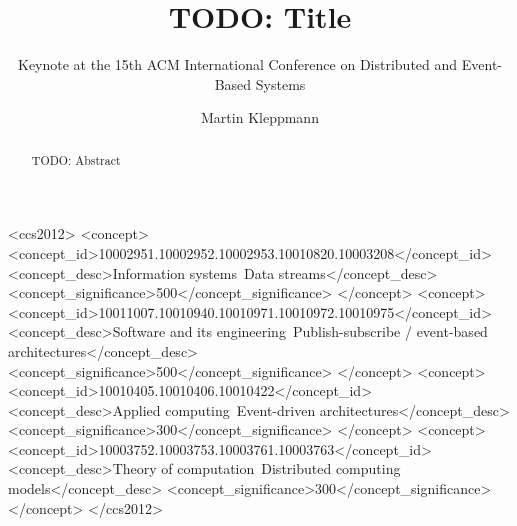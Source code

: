 \documentclass[sigconf,nonacm]{acmart}
\begin{document}
\title{TODO: Title}
\subtitle{Keynote at the 15th ACM International Conference on Distributed and Event-Based Systems}

\author{Martin Kleppmann}

\begin{abstract}
TODO: Abstract
\end{abstract}

\begin{CCSXML}
<ccs2012>
  <concept>
    <concept_id>10002951.10002952.10002953.10010820.10003208</concept_id>
    <concept_desc>Information systems~Data streams</concept_desc>
    <concept_significance>500</concept_significance>
  </concept>
  <concept>
    <concept_id>10011007.10010940.10010971.10010972.10010975</concept_id>
    <concept_desc>Software and its engineering~Publish-subscribe / event-based architectures</concept_desc>
    <concept_significance>500</concept_significance>
  </concept>
  <concept>
    <concept_id>10010405.10010406.10010422</concept_id>
    <concept_desc>Applied computing~Event-driven architectures</concept_desc>
    <concept_significance>300</concept_significance>
  </concept>
  <concept>
    <concept_id>10003752.10003753.10003761.10003763</concept_id>
    <concept_desc>Theory of computation~Distributed computing models</concept_desc>
    <concept_significance>300</concept_significance>
  </concept>
</ccs2012>
\end{CCSXML}


\maketitle


\end{document}
